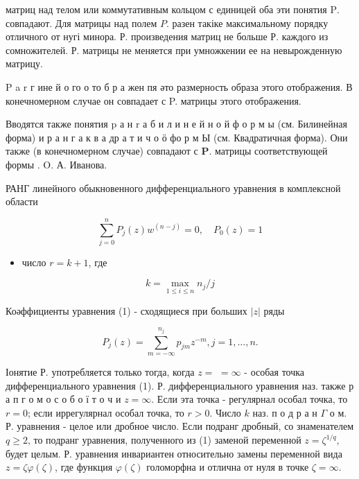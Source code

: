 \documentclass[10pt]{article}
\begin{document}
матриц над телом или коммутативным кольцом с единицей оба эти понятия $\mathrm{P}$. совпадают. Для матрицы над полем $P$. разен такіке максимальному порядку отличного от нугі минора. Р. произведения матриц не больше Р. каждого из сомножителей. Р. матрицы не меняется при умножкении ее на невырожденную матрицу.



P a r г ине й о го о то б р а жен пя әто размерность образа этого отображения. В конечномерном случае он совпадает с P. матрицы этого отображения.



Вводятся также понятия $\mathrm{p}$ а н $\mathrm{r}$ а б и л и н е й н о й ф о р м ы (см. Билинейная форма) и р а н г а к в а др а т и ч о ӧ фо р м Ы (см. Квадратичная форма). Они также (в конечномерном случае) совпадают с $\mathbf{P}$. матрицы соответствующей формы . O. А. Иванова.



РАНГ линейного обыкновенного дифференциального уравнения в комплексной области



\[

\sum_{j=0}^{n} P_{j}(z) w^{(n-j)}=0, \quad P_{0}(z)=1

\]



\begin{itemize}

  \item число $r=k+1$, где

\end{itemize}



\[

k=\max _{1 \leqslant i \leqslant n} n_{j} / j

\]



Коәффициенты уравнения (1) - сходящиеся при больших $|z|$ ряды



\[

P_{j}(z)=\sum_{m=-\infty}^{n_{j}} p_{j m} z^{-m}, j=1, \ldots, n .

\]



Іонятие Р. употребляется только тогда, когда $z=$ $=\infty$ - особая точка дифференциального уравнения (1). Р. дифференциального уравнения наз. также р а п г о м о с о б о ї т о ч и $z=\infty$. Если эта точка - регулярнал особал точка, то $r=0$; если иррегулярнал особал точка, то $r>0$. Число $k$ наз. п о д р а н $\Gamma$ о м. Р. уравнения - целое или дробное число. Если подранг дробный, со знаменателем $q \geqslant 2$, то подранг уравнения, полученного из (1) заменой переменной $z=\zeta^{1 / q}$, будет целым. Р. уравнения инвариантен относительно замены переменной вида $z=\zeta \varphi(\zeta)$, где функция $\varphi(\zeta)$ голоморфна и отлична от нуля в точке $\zeta=\infty$.
\end{document}
